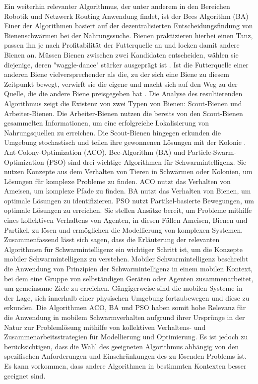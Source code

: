 Ein weiterhin relevanter Algorithmus, der unter anderem in den Bereichen Robotik und Netzwerk Routing Anwendung findet, ist der Bees Algorithm (BA) Einer der Algorithmen basiert auf der dezentralisierten Entscheidungsfindung von Bienenschwärmen bei der Nahrungssuche. Bienen praktizieren hierbei einen Tanz, passen ihn je nach Profitabilität der Futterquelle an und locken damit andere Bienen an. Müssen Bienen zwischen zwei Kandidaten entscheiden, wählen sie diejenige, deren "waggle-dance" stärker ausgeprägt ist \cite{Panigrahi2011, Yuce2013, Parpinelli2011}. Ist die Futterquelle einer anderen Biene vielversprechender als die, zu der sich eine Biene zu diesem Zeitpunkt bewegt, verwirft sie die eigene und macht sich auf den Weg zu der Quelle, die die andere Biene preisgegeben hat \cite{Bonabeau1999}. Die Analyse des resultierenden Algorithmus zeigt die Existenz von zwei Typen von Bienen: Scout-Bienen und Arbeiter-Bienen. Die Arbeiter-Bienen nutzen die bereits von den Scout-Bienen gesammelten Informationen, um eine erfolgreiche Lokalisierung von Nahrungsquellen zu erreichen. Die Scout-Bienen hingegen erkunden die Umgebung stochastisch und teilen ihre gewonnenen Lösungen mit der Kolonie \cite{Parpinelli2011}. 
Ant-Colony-Optimization (ACO), Bee-Algorithm (BA) und Particle-Swarm-Optimization (PSO) sind drei wichtige Algorithmen für Schwarmintelligenz. Sie nutzen Konzepte aus dem Verhalten von Tieren in Schwärmen oder Kolonien, um Lösungen für komplexe Probleme zu finden. ACO nutzt das Verhalten von Ameisen, um komplexe Pfade zu finden. BA nutzt das Verhalten von Bienen, um optimale Lösungen zu identifizieren. PSO nutzt Partikel-basierte Bewegungen, um optimale Lösungen zu erreichen. Sie stellen Ansätze bereit, um Probleme mithilfe eines kollektiven Verhaltens von Agenten, in diesen Fällen Ameisen, Bienen und Partikel, zu lösen und ermöglichen die Modellierung von komplexen Systemen. 
Zusammenfassend lässt sich sagen, dass die Erläuterung der relevanten Algorithmen für Schwarmintelligenz ein wichtiger Schritt ist, um die Konzepte mobiler Schwarmintelligenz zu verstehen. Mobiler Schwarmintelligenz beschreibt die Anwendung von Prinzipien der Schwarmintelligenz in einem mobilen Kontext, bei dem eine Gruppe von selbständigen Geräten oder Agenten zusammenarbeitet, um gemeinsame Ziele zu erreichen. Gängigerweise sind die mobilen Systeme in der Lage, sich innerhalb einer physischen Umgebung fortzubewegen und diese zu erkunden. Die Algorithmen ACO, BA und PSO haben somit hohe Relevanz für die Anwendung in mobilem Schwarmverhalten aufgrund ihrer Ursprünge in der Natur zur Problemlösung mithilfe von kollektiven Verhaltens- und Zusammenarbeitsstrategien für Modellierung und Optimierung. Es ist jedoch zu berücksichtigen, dass die Wahl des geeigneten Algorithmus abhängig von den spezifischen Anforderungen und Einschränkungen des zu lösenden Problems ist. Es kann vorkommen, dass andere Algorithmen in bestimmten Kontexten besser geeignet sind. 
